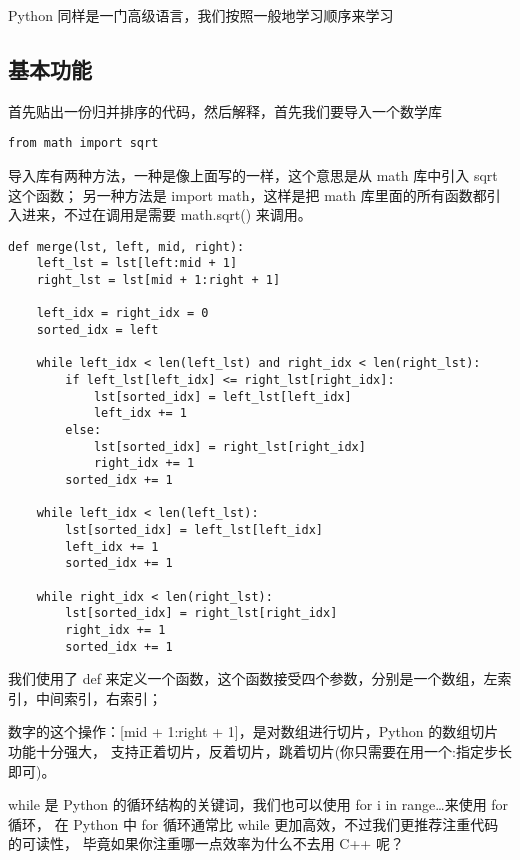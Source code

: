         Python 同样是一门高级语言，我们按照一般地学习顺序来学习

        \subsection{基本功能}\label{subsec:}
            首先贴出一份归并排序的代码，然后解释，首先我们要导入一个数学库

            \begin{verbatim}
from math import sqrt
            \end{verbatim}

            导入库有两种方法，一种是像上面写的一样，这个意思是从 math 库中引入 sqrt 这个函数；
            另一种方法是 import math，这样是把 math 库里面的所有函数都引入进来，不过在调用是需要 math.sqrt() 来调用。

            \begin{verbatim}
def merge(lst, left, mid, right):
    left_lst = lst[left:mid + 1]
    right_lst = lst[mid + 1:right + 1]

    left_idx = right_idx = 0
    sorted_idx = left

    while left_idx < len(left_lst) and right_idx < len(right_lst):
        if left_lst[left_idx] <= right_lst[right_idx]:
            lst[sorted_idx] = left_lst[left_idx]
            left_idx += 1
        else:
            lst[sorted_idx] = right_lst[right_idx]
            right_idx += 1
        sorted_idx += 1

    while left_idx < len(left_lst):
        lst[sorted_idx] = left_lst[left_idx]
        left_idx += 1
        sorted_idx += 1

    while right_idx < len(right_lst):
        lst[sorted_idx] = right_lst[right_idx]
        right_idx += 1
        sorted_idx += 1
            \end{verbatim}

            我们使用了 def 来定义一个函数，这个函数接受四个参数，分别是一个数组，左索引，中间索引，右索引；

            数字的这个操作：[mid + 1:right + 1]，是对数组进行切片，Python 的数组切片功能十分强大，
            支持正着切片，反着切片，跳着切片(你只需要在用一个:指定步长即可)。

            while 是 Python 的循环结构的关键词，我们也可以使用 for i in range\ldots 来使用 for 循环，
            在 Python 中 for 循环通常比 while 更加高效，不过我们更推荐注重代码的可读性，
            毕竟如果你注重哪一点效率为什么不去用 C++ 呢？

